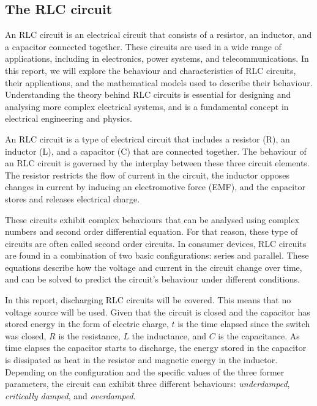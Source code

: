 \documentclass[12pt,twoside]{extarticle}
\begin{document}
\subsection{The RLC circuit}
\noindent An RLC circuit is an electrical circuit that consists of a resistor, an inductor, and a capacitor connected together. These circuits are used in a wide range of applications, including in electronics, power systems, and telecommunications. In this report, we will explore the behaviour and characteristics of RLC circuits, their applications, and the mathematical models used to describe their behaviour. Understanding the theory behind RLC circuits is essential for designing and analysing more complex electrical systems, and is a fundamental concept in electrical engineering and physics.

An RLC circuit is a type of electrical circuit that includes a resistor (R), an inductor (L), and a capacitor (C) that are connected together. The behaviour of an RLC circuit is governed by the interplay between these three circuit elements. The resistor restricts the flow of current in the circuit, the inductor opposes changes in current by inducing an electromotive force (EMF), and the capacitor stores and releases electrical charge.

These circuits exhibit complex behaviours that can be analysed using complex numbers and second order differential equation. For that reason, these type of circuits are often called second order circuits. In consumer devices, RLC circuits are found in a combination of two basic configurations: series and parallel. These equations describe how the voltage and current in the circuit change over time, and can be solved to predict the circuit's behaviour under different conditions.

In this report, discharging RLC circuits will be covered. This means that no voltage source will be used. Given that the circuit is closed and the capacitor has stored energy in the form of electric charge, $t$ is the time elapsed since the switch was closed, $R$ is the resistance, $L$ the inductance,  and $C$ is the capacitance. As time elapses the capacitor starts to discharge, the energy stored in the capacitor is dissipated as heat in the resistor and magnetic energy in the inductor. Depending on the configuration and the specific values of the three former parameters, the circuit can exhibit three different behaviours: \textit{underdamped}, \textit{critically damped}, and \textit{overdamped}.
\end{document}
